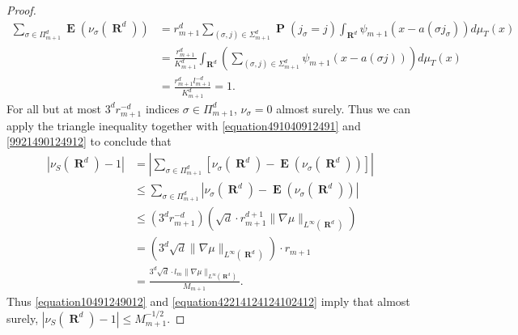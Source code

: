 \documentclass[12pt,reqno]{article}
\numberwithin{equation}{section}
\DeclareMathOperator{\RR}{\mathbf{R}}
\DeclareMathOperator{\EE}{\mathbf{E}}
\DeclareMathOperator{\PP}{\mathbf{P}}
\begin{document}
\begin{proof}
\begin{equation}
    \begin{split}
        \sum\nolimits_{\sigma \in \Pi_{m+1}^d} \EE(\nu_\sigma(\RR^d)) &= r_{m+1}^d \sum\nolimits_{(\sigma,j) \in \Sigma_{m+1}^d} \PP(j_\sigma = j) \int_{\RR^d} \psi_{m+1}(x - a(\sigma j_\sigma)) d\mu_T(x)\\
        &= \frac{r_{m+1}^d}{K_{m+1}^d} \int_{\RR^d} \left( \sum\nolimits_{(\sigma,j) \in \Sigma_{m+1}^d} \psi_{m+1}(x - a(\sigma j)) \right) d\mu_T(x)\\
        &= \frac{r_{m+1}^d l_{m+1}^{-d}}{K_{m+1}^d} = 1.
    \end{split}
    \end{equation}
    For all but at most $3^d r_{m+1}^{-d}$ indices $\sigma \in \Pi_{m+1}^d$, $\nu_\sigma = 0$ almost surely. Thus we can apply the triangle inequality together with \eqref{equation491040912491} and \eqref{9921490124912} to conclude that
    \begin{equation} \label{equation42214124124102412}
    \begin{split}
        |\nu_S(\RR^d) - 1| &= \left| \sum\nolimits_{\sigma \in \Pi_{m+1}^d} \left[ \nu_\sigma(\RR^d) - \EE(\nu_\sigma(\RR^d)) \right] \right| \\
        &\leq \sum\nolimits_{\sigma \in \Pi_{m+1}^d} \left| \nu_\sigma(\RR^d) - \EE(\nu_\sigma(\RR^d)) \right|\\
        &\leq (3^d r_{m+1}^{-d}) \left( \sqrt{d} \cdot r_{m+1}^{d+1} \| \nabla \mu \|_{L^\infty(\RR^d)} \right)\\
        &= \left( 3^d \sqrt{d} \| \nabla \mu \|_{L^\infty(\RR^d)} \right) \cdot r_{m+1}\\
        &= \frac{3^d \sqrt{d} \cdot l_m \| \nabla \mu \|_{L^\infty(\RR^d)}}{M_{m+1}}.
    \end{split}
    \end{equation}  
    Thus \eqref{equation10491249012} and \eqref{equation42214124124102412} imply that almost surely, $|\nu_S(\RR^d) - 1| \leq M_{m+1}^{-1/2}$.
\end{proof}
\end{document}
